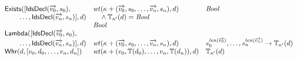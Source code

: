 \documentclass[fleqn,a4paper,dvips]{article}
\newcommand{\aterm}[1]{\mathsf{#1}}
\newcommand{\type}{\mathbb{T}}
\newcommand{\wt}{\nm{wt}}
\begin{document}
{\begin{displaymath}
\begin{array}{lll}
\aterm{Exists}([\aterm{IdsDecl}(\vect{v_0},s_0),
                                     & \wt(\kappa+(\vect{v_0},s_0,\dots,\vect{v_n},s_n),d)        & \Bool\\
\t2\dots,\aterm{IdsDecl}(\vect{v_n},s_n)], d)        
                                     & \t1\land\type_{\kappa'}(d)=\Bool                                     &\\
                   & \Bool\\
\aterm{Lambda}([\aterm{IdsDecl}(\vect{v_0},s_0),\\
\t2\dots,\aterm{IdsDecl}(\vect{v_n},s_n)], d)
                                    & \wt(\kappa+(\vect{v_0},s_0,\dots,\vect{v_n},s_n),d)         & s_0^{\nm{len}(\vect{v_0})},\dots,s_n^{\nm{len}(\vect{v_n})}\to\type_{\kappa'}(d)\\
\aterm{Whr}(d,[v_0,d_0,\dots,v_n,d_n])& \wt(\kappa+(v_0,\type(d_0),\dots,v_n,\type(d_n)),d)       & \type_{\kappa'}(d)
\end{array}
\end{displaymath}

}
\end{document}
